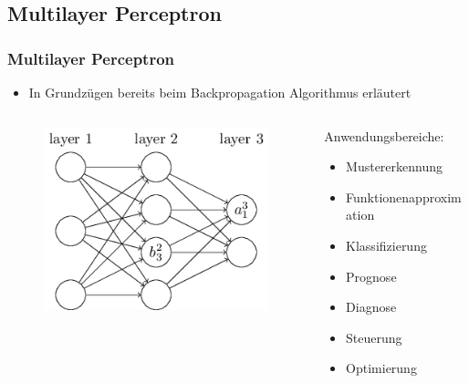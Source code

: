 \subsection{Multilayer Perceptron}

\begin{frame}
\frametitle{Multilayer Perceptron}

\hspace{-5mm}

\begin{itemize}
\item In Grundzügen bereits beim Backpropagation Algorithmus erläutert 
\end{itemize}

\hspace{5mm}

\begin{columns}

\begin{column}{.5\textwidth}
\begin{figure}
	\includegraphics[width=\linewidth]{./aktuelleEntwicklung/backpropagation/img/biasAct_notation}
\end{figure}
\end{column}

\begin{column}{.5\textwidth}

Anwendungsbereiche: 
\begin{itemize}
\item Mustererkennung 
\item Funktionenapproximation
\item Klassifizierung
\item Prognose
\item Diagnose
\item Steuerung 
\item Optimierung
\end{itemize}
\end{column}


\end{columns}
\end{frame}
